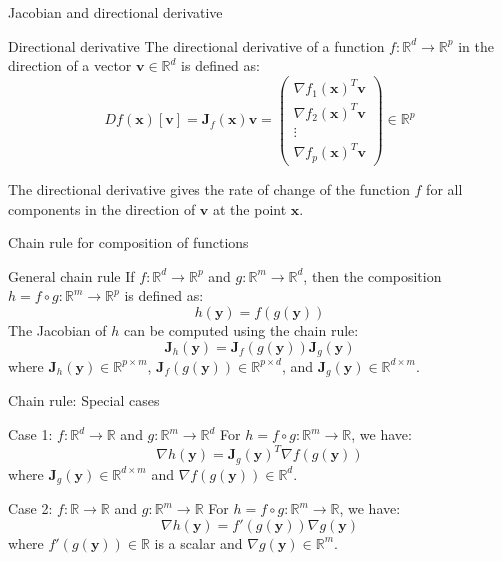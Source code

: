 \documentclass[aspectratio=1610]{beamer}
\begin{document}
\begin{frame}{Jacobian and directional derivative}
  \begin{block}{Directional derivative}
    The directional derivative of a function $f:\mathbb{R}^d \to \mathbb{R}^p$ in the direction of a vector $\mathbf{v} \in \mathbb{R}^d$ is defined as:
    $$Df(\mathbf{x})[\mathbf{v}] = \mathbf{J}_f(\mathbf{x})\mathbf{v} = \begin{pmatrix} \nabla f_1(\mathbf{x})^T \mathbf{v} \\ \nabla f_2(\mathbf{x})^T \mathbf{v} \\ \vdots \\ \nabla f_p(\mathbf{x})^T \mathbf{v} \end{pmatrix} \in \mathbb{R}^p$$
  \end{block}
  The directional derivative gives the rate of change of the function $f$ for all components in the direction of $\mathbf{v}$ at the point $\mathbf{x}$.
\end{frame}

\begin{frame}{Chain rule for composition of functions}
  \begin{block}{General chain rule}
    If $f:\mathbb{R}^d \to \mathbb{R}^p$ and $g:\mathbb{R}^m \to \mathbb{R}^d$, then the composition $h = f \circ g : \mathbb{R}^m \to \mathbb{R}^p$ is defined as:
    $$h(\mathbf{y}) = f(g(\mathbf{y}))$$
    The Jacobian of $h$ can be computed using the chain rule:
    $$\mathbf{J}_h(\mathbf{y}) = \mathbf{J}_f(g(\mathbf{y})) \mathbf{J}_g(\mathbf{y})$$
    where $\mathbf{J}_h(\mathbf{y}) \in \mathbb{R}^{p \times m}$, $\mathbf{J}_f(g(\mathbf{y})) \in \mathbb{R}^{p \times d}$, and $\mathbf{J}_g(\mathbf{y}) \in \mathbb{R}^{d \times m}$.
  \end{block}
\end{frame}

\begin{frame}{Chain rule: Special cases}
  \begin{block}{Case 1: $f:\mathbb{R}^d \to \mathbb{R}$ and $g:\mathbb{R}^m \to \mathbb{R}^d$}
    For $h = f \circ g : \mathbb{R}^m \to \mathbb{R}$, we have:
    $$\nabla h(\mathbf{y}) = \mathbf{J}_g(\mathbf{y})^T \nabla f(g(\mathbf{y}))$$
    where $\mathbf{J}_g(\mathbf{y}) \in \mathbb{R}^{d \times m}$ and $\nabla f(g(\mathbf{y})) \in \mathbb{R}^d$.
  \end{block}
  
  \begin{block}{Case 2: $f:\mathbb{R} \to \mathbb{R}$ and $g:\mathbb{R}^m \to \mathbb{R}$}
    For $h = f \circ g : \mathbb{R}^m \to \mathbb{R}$, we have:
    $$\nabla h(\mathbf{y}) = f'(g(\mathbf{y})) \nabla g(\mathbf{y})$$
    where $f'(g(\mathbf{y})) \in \mathbb{R}$ is a scalar and $\nabla g(\mathbf{y}) \in \mathbb{R}^m$.
  \end{block}
\end{frame}
\end{document}

